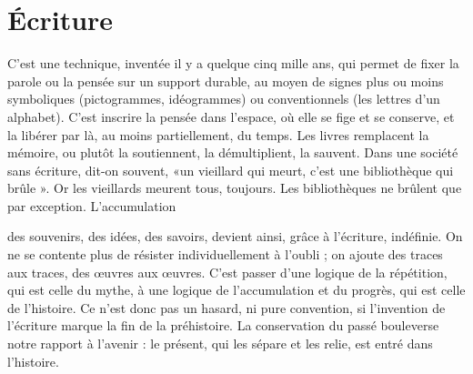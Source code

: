 \section{Écriture}
C’est une technique, inventée il y a quelque cinq mille ans, qui
permet de fixer la parole ou la pensée sur un support durable,
au moyen de signes plus ou moins symboliques (pictogrammes, idéogrammes)
ou conventionnels (les lettres d’un alphabet). C’est inscrire la pensée dans
l’espace, où elle se fige et se conserve, et la libérer par là, au moins partiellement,
du temps. Les livres remplacent la mémoire, ou plutôt la soutiennent, la
démultiplient, la sauvent. Dans une société sans écriture, dit-on souvent, «un
vieillard qui meurt, c’est une bibliothèque qui brûle ». Or les vieillards meurent
tous, toujours. Les bibliothèques ne brûlent que par exception. L’accumulation

des souvenirs, des idées, des savoirs, devient ainsi, grâce à l’écriture, indéfinie.
On ne se contente plus de résister individuellement à l'oubli ; on ajoute des
traces aux traces, des œuvres aux œuvres. C’est passer d’une logique de la répétition,
qui est celle du mythe, à une logique de l’accumulation et du progrès,
qui est celle de l’histoire. Ce n’est donc pas un hasard, ni pure convention, si
l'invention de l'écriture marque la fin de la préhistoire. La conservation du
passé bouleverse notre rapport à l’avenir : le présent, qui les sépare et les relie,
est entré dans l’histoire.

